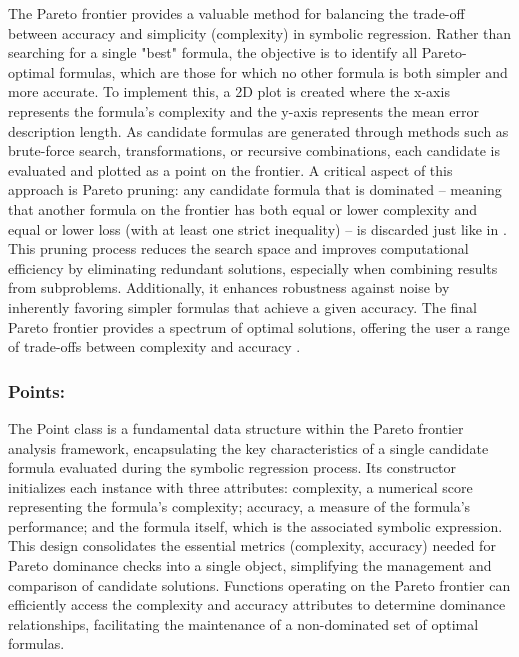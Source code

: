 \documentclass{article}
\begin{document}
The Pareto frontier provides a valuable method for balancing the trade-off between accuracy and simplicity (complexity) in symbolic regression. Rather than searching for a single "best" formula, the objective is to identify all Pareto-optimal formulas, which are those for which no other formula is both simpler and more accurate. To implement this, a 2D plot is created where the x-axis represents the formula's complexity and the y-axis represents the mean error description length. As candidate formulas are generated through methods such as brute-force search, transformations, or recursive combinations, each candidate is evaluated and plotted as a point on the frontier. A critical aspect of this approach is Pareto pruning: any candidate formula that is dominated – meaning that another formula on the frontier has both equal or lower complexity and equal or lower loss (with at least one strict inequality) – is discarded just like in \cite{cranmer2023}. This pruning process reduces the search space and improves computational efficiency by eliminating redundant solutions, especially when combining results from subproblems. Additionally, it enhances robustness against noise by inherently favoring simpler formulas that achieve a given accuracy. The final Pareto frontier provides a spectrum of optimal solutions, offering the user a range of trade-offs between complexity and accuracy \cite{lacava2021}.\\



\subsubsection{Points:}


The Point class is a fundamental data structure within the Pareto frontier analysis framework, encapsulating the key characteristics of a single candidate formula evaluated during the symbolic regression process. Its constructor initializes each instance with three attributes: complexity, a numerical score representing the formula's complexity; accuracy, a measure of the formula's performance; and the formula itself, which is the associated symbolic expression. This design consolidates the essential metrics (complexity, accuracy) needed for Pareto dominance checks into a single object, simplifying the management and comparison of candidate solutions. Functions operating on the Pareto frontier can efficiently access the complexity and accuracy attributes to determine dominance relationships, facilitating the maintenance of a non-dominated set of optimal formulas.\\
\end{document}

